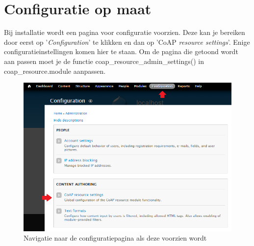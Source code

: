 \section{Configuratie op maat} \label{configuratie}
Bij installatie wordt een pagina voor configuratie voorzien. Deze kan je bereiken door eerst op '\textit{Configuration}' te klikken en dan op 'CoAP \textit{resource settings}'. Enige configuratieinstellingen komen hier te staan. Om de pagina die getoond wordt aan passen moet je de functie coap\_resource\_admin\_settings() in coap\_resource.module aanpassen.
\begin{figure}[h!]
\vspace{10pt}
\includegraphics[width=1\textwidth]{fig/Configuratie}
\vspace{-30pt}
\caption{Navigatie naar de configuratiepagina als deze voorzien wordt}
\vspace{-10pt}
\end{figure}


